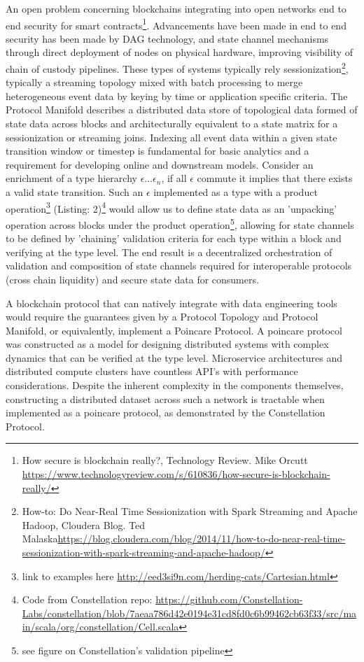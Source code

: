 \documentclass{article}
\begin{document}
An open problem concerning blockchains integrating into open networks end to end security for smart contracts\footnote{How secure is blockchain really?, Technology Review. Mike Orcutt \url{https://www.technologyreview.com/s/610836/how-secure-is-blockchain-really/}}. Advancements have been made in end to end security has been made by DAG technology, and state channel mechanisms through direct deployment of nodes on physical hardware, improving visibility of chain of custody pipelines. These types of systems typically rely sessionization\footnote{How-to: Do Near-Real Time Sessionization with Spark Streaming and Apache Hadoop, Cloudera Blog. Ted Malaska\url{https://blog.cloudera.com/blog/2014/11/how-to-do-near-real-time-sessionization-with-spark-streaming-and-apache-hadoop/}}, typically a streaming topology mixed with batch processing to merge heterogeneous event data by keying by time or application specific criteria. The Protocol Manifold describes a distributed data store of topological data formed of state data across blocks and architecturally equivalent to a state matrix for a sessionization or streaming joins. Indexing all event data within a given state transition window or timestep is fundamental for basic analytics and a requirement for developing online and downstream models. Consider an enrichment of a type hierarchy $\epsilon \dots \epsilon_{n}$, if all $\epsilon$ commute it implies that there exists a valid state transition. Such an $\epsilon$ implemented as a type with a product operation\footnote{link to examples here \url{http://eed3si9n.com/herding-cats/Cartesian.html}} (Listing: 2)\footnote{Code from Constellation repo: \url{https://github.com/Constellation-Labs/constellation/blob/7aeaa786d42e0194e31cd8fd0c6b99462cb63f33/src/main/scala/org/constellation/Cell.scala}} would allow us to define state data as an ’unpacking’ operation across blocks under the product operation\footnote{see figure on Constellation's validation pipeline}, allowing for state channels to be defined by 'chaining' validation criteria for each type within a block and verifying at the type level. The end result is a decentralized orchestration of validation and composition of state channels required for interoperable protocols (cross chain liquidity) and secure state data for consumers.

A blockchain protocol that can natively integrate with data engineering tools would require the guarantees given by a Protocol Topology and Protocol Manifold, or equivalently, implement a Poincare Protocol. A poincare protocol was constructed as a model for designing distributed systems with complex dynamics that can be verified at the type level. Microservice architectures and distributed compute clusters have countless API's with performance considerations. Despite the inherent complexity in the components themselves, constructing a distributed dataset across such a network is tractable when implemented as a poincare protocol, as demonstrated by the Constellation Protocol.
\end{document}
